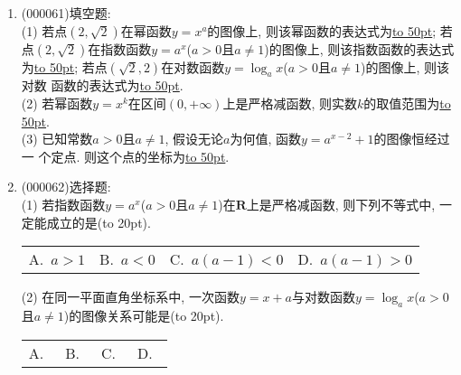 \documentclass[10pt,a4paper]{article}
\newcommand{\blank}[1]{\underline{\hbox to #1pt{}}}
\newcommand{\bracket}[1]{(\hbox to #1pt{})}
\newcommand{\fourch}[4]{\par\begin{tabular}{p{.23\textwidth}p{.23\textwidth}p{.23\textwidth}p{.23\textwidth}}
A.~#1 &B.~#2& C.~#3& D.~#4
\end{tabular}}
\begin{document}
\begin{enumerate}[1.]

\item {\tiny (000061)}填空题:\\
(1) 若点$(2, \sqrt 2)$在幂函数$y=x^a$的图像上, 则该幂函数的表达式为\blank{50}; 若点$(2, \sqrt 2)$在指数函数$y=a^x$($a>0$且$a\ne 1$)的图像上, 则该指数函数的表达式为\blank{50}; 若点$(\sqrt 2, 2)$在对数函数$y=\log_a x$($a>0$且$a\ne 1$)的图像上, 则该对数
函数的表达式为\blank{50}.\\
(2) 若幂函数$y=x^k$在区间$(0, +\infty)$上是严格减函数, 则实数$k$的取值范围为\blank{50}.\\
(3) 已知常数$a>0$且$a\ne 1$, 假设无论$a$为何值, 函数$y=a^{x-2}+1$的图像恒经过一
个定点. 则这个点的坐标为\blank{50}.
\item {\tiny (000062)}选择题:\\
(1) 若指数函数$y=a^x$($a>0$且$a\ne 1$)在$\mathbf{R}$上是严格减函数, 则下列不等式中, 一定能成立的是\bracket{20}.
\fourch{$a>1$}{$a<0$}{$a(a-1)<0$}{$a(a-1)>0$}
(2) 在同一平面直角坐标系中, 一次函数$y=x+a$与对数函数$y=\log_ax$($a>0$且$a\ne 1$)的图像关系可能是\bracket{20}.
\fourch{\begin{tikzpicture}[scale = 0.5,>=latex]
    \draw [->] (-2,0) -- (3,0) node [below] {$x$};
    \draw [->] (0,-2) -- (0,3) node [left] {$y$};
    \draw (0,0) node [below left] {$O$};
    \draw (0.1,1) -- (0,1) node [left] {$1$};
    \draw (1,0) node [below] {$1$};
    \draw [thick] (-2,-0.3) -- (1.3,3);
    \draw [thick,domain =-1.1:2.1,samples = 200] plot ({0.5^\x},\x);
\end{tikzpicture}
}{\begin{tikzpicture}[scale = 0.5,>=latex]
    \draw [->] (-2,0) -- (3,0) node [below] {$x$};
    \draw [->] (0,-2) -- (0,3) node [left] {$y$};
    \draw (0,0) node [below left] {$O$};
    \draw (0.1,1) -- (0,1) node [left] {$1$};
    \draw (1,0) node [below] {$1$};
    \draw [thick] (-2,-1.5) -- (2.5,3);
    \draw [thick,domain =1.5:-1.5,samples = 200] plot ({0.5^\x},-\x);
\end{tikzpicture}
}{\begin{tikzpicture}[scale = 0.5,>=latex]
    \draw [->] (-2,0) -- (3,0) node [below] {$x$};
    \draw [->] (0,-2) -- (0,3) node [left] {$y$};
    \draw (0,0) node [below left] {$O$};
    \draw (0.1,1) -- (0,1) node [left] {$1$};
    \draw (1,0) node [below] {$1$};
    \draw [thick] (-2,-1.5) -- (2.5,3);
    \draw [thick,domain =-1.1:2.1,samples = 200] plot ({0.5^\x},\x);
\end{tikzpicture}
}{\begin{tikzpicture}[scale = 0.5,>=latex]

\end{tikzpicture}}
\end{enumerate}
\end{document}
